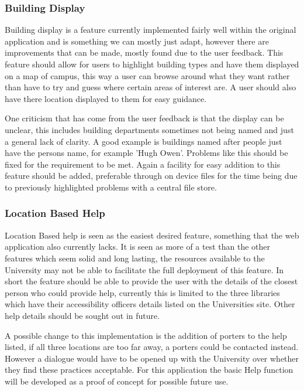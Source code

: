 \subsubsection{Building Display}
Building display is a feature currently implemented fairly well within the original application and is something we can mostly just adapt, however there are improvements that can be made, mostly found due to the user feedback. This feature should allow for users to highlight building types and have them displayed on a map of campus, this way a user can browse around what they want rather than have to try and guess where certain areas of interest are. A user should also have there location displayed to them for easy guidance.

One criticism that has come from the user feedback is that the display can be unclear, this includes building departments sometimes not being named and just a general lack of clarity. A good example is buildings named after people just have the persons name, for example 'Hugh Owen'. Problems like this should be fixed for the requirement to be met. Again a facility for easy addition to this feature should be added, preferable through on device files for the time being due to previously highlighted problems with a central file store. 
\subsubsection{Location Based Help}
Location Based help is seen as the easiest desired feature, something that the web application also currently lacks. It is seen as more of a test than the other features which seem solid and long lasting, the resources available to the University may not be able to facilitate the full deployment of this feature.  In short the feature should be able to provide the user with the details of the closest person who could provide help, currently this is limited to the three libraries which have their accessibility officers details listed on the Universities site. Other help details should be sought out in future.

A possible change to this implementation is the addition of porters to the help listed, if all three locations are too far away, a porters could be contacted instead. However a dialogue would have to be opened up with the University over whether they find these practices acceptable. For this application the basic Help function will be developed as a proof of concept for possible future use.
  
